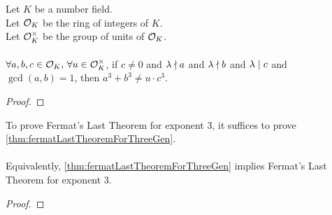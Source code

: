\begin{theorem}
    \label{thm:fermatLastTheoremForThreeGen}
    \leanok
    Let $K$ be a number field. \\
    Let $\mathcal{O}_K$ be the ring of integers of $K$. \\
    Let $\mathcal{O}^\times_K$ be the group of units of $\mathcal{O}_K$. \\ \\
    $\forall a, b, c \in \mathcal{O}_K,\, \forall u \in \mathcal{O}^\times_K$, if $c \neq 0$
    and $\lambda \nmid a$ and $\lambda \nmid b$ and
    $\lambda \mid c$ and $\gcd(a,b)=1$, then $a^3 + b^3 \neq u \cdot c^3$.
\end{theorem}
\begin{proof}
    \leanok
\end{proof}

\begin{lemma}
    \label{lmm:FermatLastTheoremForThree_of_FermatLastTheoremThreeGen}
    \leanok
    To prove Fermat's Last Theorem for exponent $3$,
    it suffices to prove \ref{thm:fermatLastTheoremForThreeGen}. \\\\
    Equivalently, \ref{thm:fermatLastTheoremForThreeGen} implies
    Fermat's Last Theorem for exponent $3$.
\end{lemma}
\begin{proof}
    \leanok
\end{proof}